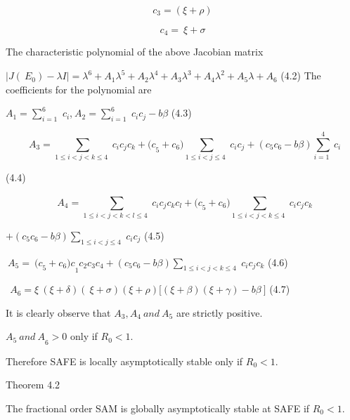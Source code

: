 \documentclass[10pt]{NSP1}
\begin{document}
\begin{equation}
c_{3} = (\xi + \rho)

\end{equation}

\begin{equation}
c_{4} = \ \xi + \sigma

\end{equation}

The characteristic polynomial of the above Jacobian matrix

$\left| J\left( {\ E}_{0} \right) - \lambda I \right| = \lambda^{6} + A_{1}\lambda^{5} + A_{2}\lambda^{4} + A_{3}\lambda^{3} + A_{4}\lambda^{2} + A_{5}\lambda + A_{6}$ (4.2) The coefficients for the polynomial are

$A_{1} = \sum_{i = 1\ \ }^{6}{}c_{i}$,${\ A}_{2} = \sum_{i = 1\ \ }^{6}{}c_{i}c_{j} - b\beta$ (4.3)

\begin{equation}
{\ \ A}_{3} = \sum_{1 \leq i < j < k \leq 4\ \ }^{}{}c_{i}c_{j}c_{k} + {(c}_{5} + c_{6})\sum_{1 \leq i < j \leq 4\ \ }^{}{}c_{i}c_{j} + (c_{5}c_{6} - b\beta)\sum_{i = 1\ \ }^{4}{}c_{i}

\end{equation}

(4.4)

\begin{equation}
{\ \ A}_{4} = \sum_{1 \leq i < j < k < l \leq 4\ \ }^{}{}c_{i}c_{j}c_{k}c_{l} + {(c}_{5} + c_{6})\sum_{1 \leq i < j < k \leq 4\ \ }^{}{}c_{i}c_{j}c_{k}

\end{equation}

$+ (c_{5}c_{6} - b\beta)\sum_{1 \leq i < j \leq 4\ \ }^{}{}c_{i}c_{j}$ (4.5)

${\ A}_{5} = \ {{(c}_{5} + c_{6})c}_{1}c_{2}c_{3}c_{4} + (c_{5}c_{6} - b\beta)\sum_{1 \leq i < j < k \leq 4\ \ }^{}{}c_{i}c_{j}c_{k}$ (4.6)

${\ \ A}_{6} = \xi\ (\xi + \delta)(\ \xi + \sigma)(\xi + \rho)\lbrack(\xi + \beta)(\xi + \gamma) - b\beta\ \rbrack$ (4.7)

It is clearly observe that $A_{3},A_{4}\ and\ A_{5}$ are strictly positive.

${A_{5}\ and\ A}_{6} > 0$ only if $R_{0} < 1$.

Therefore SAFE is locally asymptotically stable only if $R_{0} < 1.$

Theorem 4.2

The fractional order SAM is globally asymptotically stable at SAFE if $R_{0} < 1.$
\end{document}
